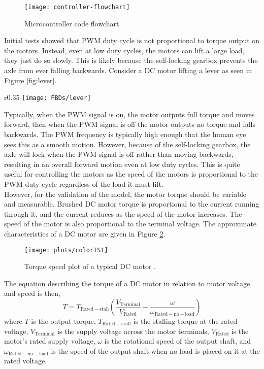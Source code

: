 \begin{figure}[!h]
	\centering
	\texttt{[image: controller-flowchart]}
	\caption{Microcontroller code flowchart.}
	\label{fig:controller-flowchart}
\end{figure}

Initial tests showed that PWM duty cycle is not proportional to torque output on the motors. Instead, even at low duty cycles, the motors can lift a large load, they just do so slowly. This is likely because the self-locking gearbox prevents the axle from ever falling backwards. Consider a DC motor lifting a lever as seen in Figure \ref{fig:lever}. 

\begin{wrapfigure}{r}{0.35\textwidth}
	\centering
	\texttt{[image: FBDs/lever]}
	\caption{Lever example.}
	\label{fig:lever}
\end{wrapfigure}

Typically, when the PWM signal is on, the motor outputs full torque and moves forward, then when the PWM signal is off the motor outputs no torque and falls backwards. The PWM frequency is typically high enough that the human eye sees this as a smooth motion. However, because of the self-locking gearbox, the axle will lock when the PWM signal is off rather than moving backwards, resulting in an overall forward motion even at low duty cycles. This is quite useful for controlling the motors as the speed of the motors is proportional to the PWM duty cycle regardless of the load it must lift.\\

However, for the validation of the model, the motor torque should be variable and measurable. Brushed DC motor torque is proportional to the current running through it, and the current reduces as the speed of the motor increases. The speed of the motor is also proportional to the terminal voltage. The approximate characteristics of a DC motor are given in Figure \ref{fig:torque-speed}. 
\begin{figure}[!h]
	\centering
	\texttt{[image: plots/colorTS1]}
	\caption{Torque speed plot of a typical DC motor \citep{Page-1999}.}
	\label{fig:torque-speed}
\end{figure}

\noindent The equation describing the torque of a DC motor in relation to motor voltage and speed is then,
\begin{equation}
	T = T_\mathrm{Rated-stall}(\frac{V_\mathrm{Terminal}}{V_\mathrm{Rated}}-\frac{\omega}{\omega_\mathrm{Rated-no-load}})
\end{equation}
where $T$ is the output torque, $T_\mathrm{Rated-stall}$ is the stalling torque at the rated voltage, $V_\mathrm{Terminal}$ is the supply voltage across the motor terminals, $V_\mathrm{Rated}$ is the motor's rated supply voltage, $\omega$ is the rotational speed of the output shaft, and $\omega_\mathrm{Rated-no-load}$ is the speed of the output shaft when no load is placed on it at the rated voltage.\\

